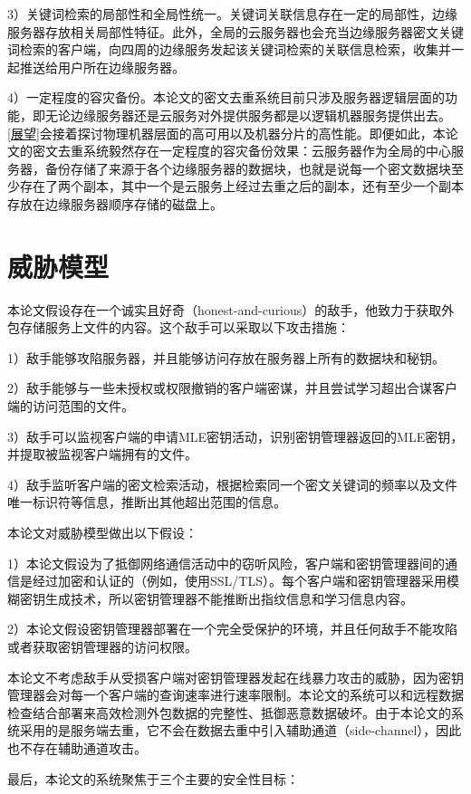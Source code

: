 \documentclass[promaster]{thesis-uestc}
\begin{document}
3）关键词检索的局部性和全局性统一。关键词关联信息存在一定的局部性，边缘服务器存放相关局部性特征。此外，全局的云服务器也会充当边缘服务器密文关键词检索的客户端，向四周的边缘服务发起该关键词检索的关联信息检索，收集并一起推送给用户所在边缘服务器。

4）一定程度的容灾备份。本论文的密文去重系统目前只涉及服务器逻辑层面的功能，即无论边缘服务器还是云服务对外提供服务都是以逻辑机器服务提供出去。\ref{展望}会接着探讨物理机器层面的高可用以及机器分片的高性能。即便如此，本论文的密文去重系统毅然存在一定程度的容灾备份效果：云服务器作为全局的中心服务器，备份存储了来源于各个边缘服务器的数据块，也就是说每一个密文数据块至少存在了两个副本，其中一个是云服务上经过去重之后的副本，还有至少一个副本存放在边缘服务器顺序存储的磁盘上。
\section{威胁模型}
本论文假设存在一个诚实且好奇（honest-and-curious）的敌手，他致力于获取外包存储服务上文件的内容。这个敌手可以采取以下攻击措施：

1）敌手能够攻陷服务器，并且能够访问存放在服务器上所有的数据块和秘钥。

2）敌手能够与一些未授权或权限撤销的客户端密谋，并且尝试学习超出合谋客户端的访问范围的文件。

3）敌手可以监视客户端的申请MLE密钥活动，识别密钥管理器返回的MLE密钥，并提取被监视客户端拥有的文件。

4）敌手监听客户端的密文检索活动，根据检索同一个密文关键词的频率以及文件唯一标识符等信息，推断出其他超出范围的信息。

本论文对威胁模型做出以下假设：

1）本论文假设为了抵御网络通信活动中的窃听风险，客户端和密钥管理器间的通信是经过加密和认证的（例如，使用SSL/TLS）。每个客户端和密钥管理器采用模糊密钥生成技术，所以密钥管理器不能推断出指纹信息和学习信息内容。

2）本论文假设密钥管理器部署在一个完全受保护的环境，并且任何敌手不能攻陷或者获取密钥管理器的访问权限。

本论文不考虑敌手从受损客户端对密钥管理器发起在线暴力攻击的威胁，因为密钥管理器会对每一个客户端的查询速率进行速率限制。本论文的系统可以和远程数据检查结合部署来高效检测外包数据的完整性、抵御恶意数据破坏。由于本论文的系统采用的是服务端去重，它不会在数据去重中引入辅助通道（side-channel），因此也不存在辅助通道攻击。

最后，本论文的系统聚焦于三个主要的安全性目标：
\end{document}
